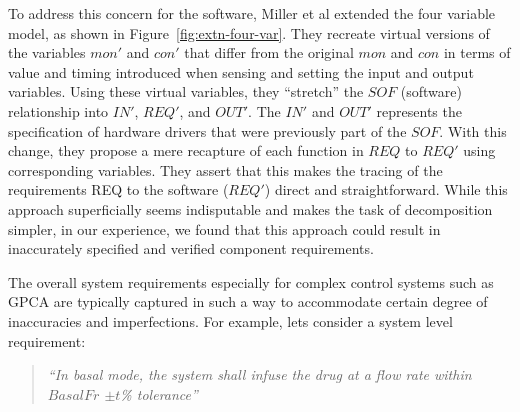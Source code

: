 To address this concern for the software, Miller et al extended the four variable model, as shown in Figure~\ref{fig:extn-four-var}. They recreate virtual versions of the variables $mon'$ and $con'$ that differ from the original $mon$ and $con$ in terms of value and timing introduced when sensing and setting the input and output variables. Using these virtual variables, they ``stretch'' the $SOF$ (software) relationship into $IN'$, $REQ'$, and $OUT'$. The $IN'$ and $OUT'$ represents the specification of hardware drivers that were previously part of the $SOF$. With this change, they propose a mere recapture of each function in $REQ$ to $REQ'$ using corresponding variables. They assert that this makes the tracing of the requirements REQ to the software ($REQ'$) direct and straightforward. While this approach superficially seems indisputable and makes the task of decomposition simpler, in our experience, we found that this approach could result in inaccurately specified and verified component requirements.

The overall system requirements especially for complex control systems such as GPCA are typically captured in such a way to accommodate certain degree of inaccuracies and imperfections. For example, lets consider a system level requirement:

\begin{quotation}
\emph{``In basal mode, the system shall infuse the drug at a flow rate within $BasalFr$ $\pm t$\% tolerance''}
\end{quotation}

